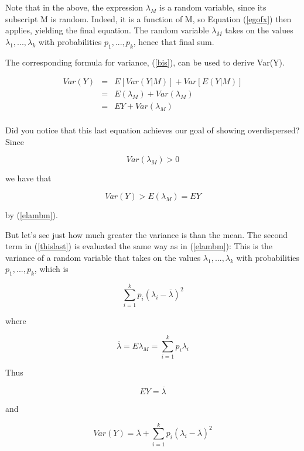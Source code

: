 \documentclass[11pt]{article}
\begin{document}
Note that in the above, the expression $\lambda_M$ is a random variable,
since its subscript M is random.  Indeed, it is a function of M, so
Equation (\ref{egofx}) then applies, yielding the final equation.  The
random variable $\lambda_M$ takes on the values $\lambda_1,...,\lambda_k$
with probabilities $p_1,...,p_k$, hence that final sum.

The corresponding formula for variance, (\ref{bis}), can be used to
derive Var(Y).

\begin{eqnarray}
Var(Y) &=& E[Var(Y|M)] + Var[E(Y|M)] \\ 
&=& E(\lambda_M) + Var(\lambda_M) \label{thislast} \\
&=& EY + Var(\lambda_M) \label{thislast} \\
\end{eqnarray}

Did you notice that this last equation achieves our goal of showing
overdispersed?  Since

\begin{equation}
Var(\lambda_M) > 0
\end{equation}

we have that

\begin{equation}
Var(Y) > E(\lambda_M) = EY
\end{equation}

by (\ref{elambm}).

But let's see just how much greater the variance is than the mean.  The
second term in (\ref{thislast}) is evaluated the same way as in
(\ref{elambm}):  This is the variance of a random variable that takes on
the values $\lambda_1,...,\lambda_k$ with probabilities $p_1,...,p_k$,
which is

\begin{equation}
\sum_{i=1}^k p_i (\lambda_i - \overline{\lambda})^2
\end{equation}

where 

\begin{equation}
\overline{\lambda} =  E\lambda_M = \sum_{i=1}^k p_i \lambda_i
\end{equation}

Thus

\begin{equation}
EY = \overline{\lambda}
\end{equation}

and

\begin{equation}
Var(Y) = \overline{\lambda} + 
\sum_{i=1}^k p_i (\lambda_i - \overline{\lambda})^2
\end{equation}
\end{document}
